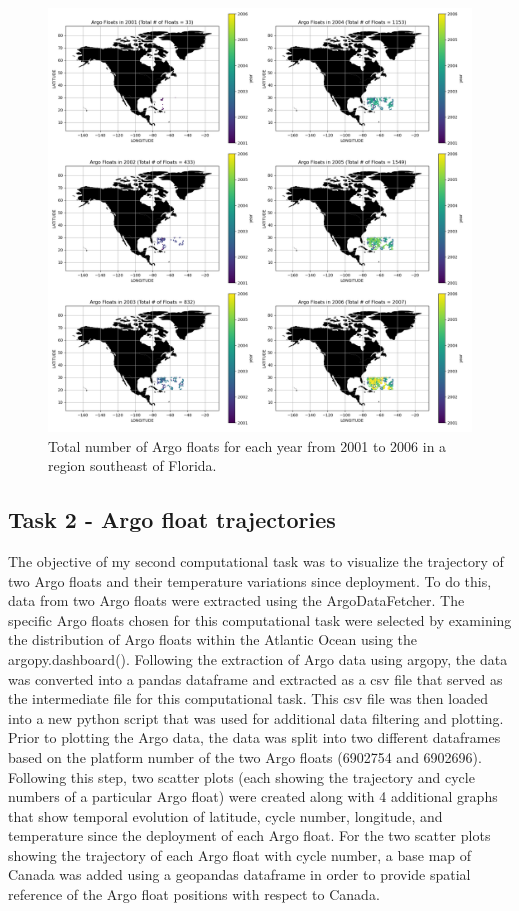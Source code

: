 \documentclass{article}
\begin{document}
\begin{figure}[H]
\includegraphics[width=\textwidth,height=\textheight,keepaspectratio]{total_argo.png}
\caption{Total number of Argo floats for each year from 2001 to 2006 in a region southeast of Florida.}
 
\end{figure}


\subsection{Task 2 - Argo float trajectories}

The objective of my second computational task was to visualize the trajectory of two Argo floats and their temperature variations since deployment. To do this, data from two Argo floats were extracted using the ArgoDataFetcher. The specific Argo floats chosen for this computational task were selected by examining the distribution of Argo floats within the Atlantic Ocean using the argopy.dashboard(). Following the extraction of Argo data using argopy, the data was converted into a pandas dataframe and extracted as a csv file that served as the intermediate file for this computational task. This csv file was then loaded into a new python script that was used for additional data filtering and plotting. Prior to plotting the Argo data, the data was split into two different dataframes based on the platform number of the two Argo floats (6902754 and 6902696). Following this step, two scatter plots (each showing the trajectory and cycle numbers of a particular Argo float) were created along with 4 additional graphs that show temporal evolution of latitude, cycle number, longitude, and temperature since the deployment of each Argo float. For the two scatter plots showing the trajectory of each Argo float with cycle number, a base map of Canada was added using a geopandas dataframe in order to provide spatial reference of the Argo float positions with respect to Canada.
\end{document}
